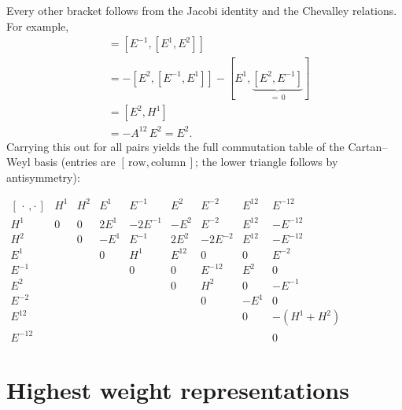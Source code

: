 {    Every other bracket follows from the Jacobi identity and the Chevalley relations. For example,
    \begin{align*}
        [E^{-1}, E^{+12}]
            &= [E^{-1}, [E^1, E^2]] \\
            &= -[E^2, [E^{-1}, E^1]] - [E^1, \underbrace{[E^2, E^{-1}]}_{=\,0}] \\
            &= [E^2, H^1] \\
            &= -A^{12}\, E^2 = E^2.
    \end{align*}
    Carrying this out for all pairs yields the full commutation table of the Cartan--Weyl basis
    (entries are $[\,\text{row}, \text{column}\,]$; the lower triangle follows by antisymmetry):
    \begin{center}
    \renewcommand{\arraystretch}{1.3}
    \setlength{\arraycolsep}{4pt}
    $\begin{array}{c|cccccccc}
        [\,\cdot\,,\cdot\,] & H^1 & H^2 & E^1 & E^{-1} & E^2 & E^{-2} & E^{12} & E^{-12} \\
        \hline
        H^1    & 0 & 0 & 2E^1 & -2E^{-1} & -E^2 & E^{-2} & E^{12} & -E^{-12} \\
        H^2    &   & 0 & -E^1 & E^{-1}   & 2E^2 & -2E^{-2} & E^{12} & -E^{-12} \\
        E^1    &   &   & 0    & H^1      & E^{12} & 0      & 0      & E^{-2} \\
        E^{-1} &   &   &      & 0        & 0    & E^{-12}  & E^2    & 0 \\
        E^2    &   &   &      &          & 0    & H^2      & 0      & -E^{-1} \\
        E^{-2} &   &   &      &          &      & 0        & -E^1   & 0 \\
        E^{12} &   &   &      &          &      &          & 0      & -(H^1 + H^2) \\
        E^{-12}&   &   &      &          &      &          &        & 0
    \end{array}$
    \end{center}
}

\section{Highest weight representations}


